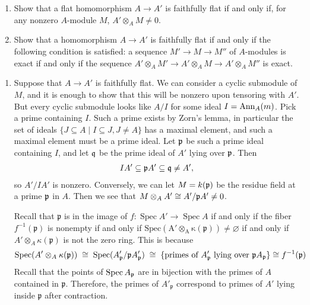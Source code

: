 \documentclass[12pt]{article}
\begin{document}
\begin{exercise}
    \begin{enumerate}
        \item Show that a flat homomorphism $A \to A'$ is faithfully flat if and only if, for any nonzero $A$-module $M$, $A' \otimes_A M \neq 0$.

        \item Show that a homomorphism $A \to A'$ is faithfully flat if and only if the following condition is satisfied: a sequence $M' \to M \to M''$ of $A$-modules is exact if and only if the sequence $A' \otimes_A M' \to A' \otimes_A M \to A' \otimes_A M''$ is exact.
    \end{enumerate}
\end{exercise}

\begin{enumerate}
    \item Suppose that $A \to A'$ is faithfully flat. We can consider a cyclic submodule of $M$, and it is enough to show that this will be nonzero upon tensoring with $A'$. But every cyclic submodule looks like $A/I$ for some ideal $I = \operatorname{Ann}_A(m)$. Pick a prime containing $I$. Such a prime exists by Zorn's lemma, in particular the set of ideals $\{ J \subseteq A \mid I \subseteq J, J \neq A\}$ has a maximal element, and such a maximal element must be a prime ideal. Let $\mathfrak{p}$ be such a prime ideal containing $I$, and let $\mathfrak{q}$ be the prime ideal of $A'$ lying over $\mathfrak{p}$. Then \begin{align*}
    IA' \subseteq \mathfrak{p}A' \subseteq \mathfrak{q} \neq A',
\end{align*} so $A'/IA'$ is nonzero. Conversely, we can let $M = k(\mathfrak{p})$ be the residue field at a prime $\mathfrak{p}$ in $A$. Then we see that $M \otimes_A A' \cong A'/\mathfrak{p}A' \neq 0$.

Recall that  $\mathfrak p$ is in the image of $f:\operatorname{Spec}A' \to \operatorname{Spec}A$
if and only if the fiber $f^{-1}(\mathfrak p)$ is nonempty if and only if $\operatorname{Spec (A'\otimes_A \kappa(\mathfrak p)) \neq \varnothing}$ if and only if $A'\otimes_A \kappa(\mathfrak p)$ is not the zero ring. This is because \[\operatorname{Spec}(A'\otimes_A \kappa(\mathfrak p))
    \;\cong\; \operatorname{Spec}(A'_{\mathfrak p}/\mathfrak p A'_{\mathfrak p})
    \;\cong\; \{\text{primes of } A'_{\mathfrak p} \text{ lying over } \mathfrak p A_{\mathfrak p}\} \cong f^{-1}(\mathfrak{p})\] Recall that the points of $\operatorname{Spec} A_\mathfrak p$ are in bijection with the primes of $A$ contained in $\mathfrak p$. Therefore, the primes of $A'_{\mathfrak p}$ correspond to primes of $A'$ lying inside $\mathfrak p$ after contraction.


\end{enumerate}
\end{document}
